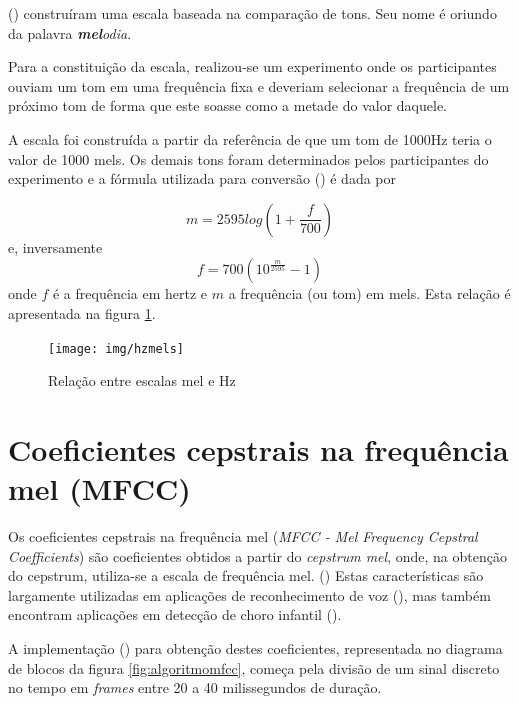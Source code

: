 \documentclass[10pt,a4paper]{article}
\begin{document}
\begin{multicols*}{2}
(\cite{stevens1937}) construíram uma escala baseada na comparação de tons. Seu nome é oriundo da palavra \textit{\textbf{mel}odia}. 

Para a constituição da escala, realizou-se um experimento onde os participantes ouviam um tom em uma frequência fixa e deveriam selecionar a frequência de um próximo tom de forma que este soasse como a metade do valor daquele.

A escala foi construída a partir da referência de que um tom de 1000Hz teria o valor de 1000 mels. Os demais tons foram determinados pelos participantes do experimento e a fórmula utilizada para conversão (\cite{oshaughnessy1987}) é dada por

\begin{equation}
 m = 2595 log(1+\frac{f}{700})
\end{equation}
e, inversamente
\begin{equation}
f = 700(10^{\frac{m}{2595}}-1)
\end{equation}
onde $ f $ é a frequência em hertz e $ m $ a frequência (ou tom) em mels. Esta relação é apresentada na figura \ref{fig:hzmels}.

\begin{figure}[H]
	\centering\texttt{[image: img/hzmels]}
	\caption{Relação entre escalas mel e Hz}
	\label{fig:hzmels}
\end{figure}


\section{Coeficientes cepstrais na frequência mel (MFCC)}

Os coeficientes cepstrais na frequência mel (\textit{MFCC - Mel Frequency Cepstral Coefficients}) são coeficientes obtidos a partir do \textit{cepstrum mel}, onde, na obtenção do cepstrum, utiliza-se a escala de frequência mel. (\cite{davis1980})
\newline Estas características são largamente utilizadas em aplicações de reconhecimento de voz (\cite{benesty2007springer}), mas também encontram aplicações em detecção de choro infantil (\cite{cohen2012}).
				
A implementação (\cite{mfcc_implementation}) para obtenção destes coeficientes, representada no diagrama de blocos da figura \ref{fig:algoritmomfcc}, começa pela divisão de um sinal discreto no tempo em \textit{frames} entre 20 a 40 milissegundos de duração.
			

\end{multicols*}
\end{document}
